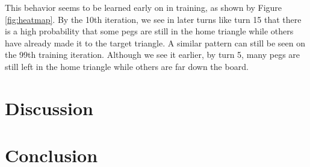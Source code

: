 \documentclass[12pt, a4paper, twocolumn]{article}
\begin{document}
This behavior seems to be learned early on in training, as shown by Figure \ref{fig:heatmap}. By the 10th iteration, we see in later turns like turn 15 that there is a high probability that some pegs are still in the home triangle while others have already made it to the target triangle. A similar pattern can still be seen on the 99th training iteration. Although we see it earlier, by turn 5, many pegs are still left in the home triangle while others are far down the board.



\section{Discussion}

\lipsum[1]

\section{Conclusion}

\lipsum[1]


\nocite{*}


\end{document}
